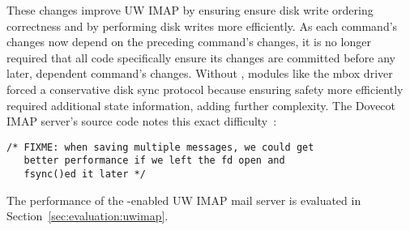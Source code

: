 These changes improve UW IMAP by
%
ensuring ensure disk write ordering correctness
%
and by performing disk writes more efficiently.
%
As each command's changes now depend on the preceding command's
changes, it is no longer required that all code
specifically ensure its changes are committed before any later, dependent
command's changes. Without \patchgroups, modules like the mbox driver
forced a conservative disk sync protocol because ensuring safety more
efficiently required additional state information, adding further
complexity. The Dovecot IMAP server's source code notes this exact
difficulty~\cite[maildir-save.c]{dovecot}:

\vspace{-0.5\baselineskip}
\begin{scriptsize}
\begin{verbatim}
/* FIXME: when saving multiple messages, we could get
   better performance if we left the fd open and
   fsync()ed it later */
\end{verbatim}
\end{scriptsize}
\vspace{-0.5\baselineskip}

The performance of the \patchgroup{}-enabled UW IMAP mail server is
evaluated in Section~\ref{sec:evaluation:uwimap}.

